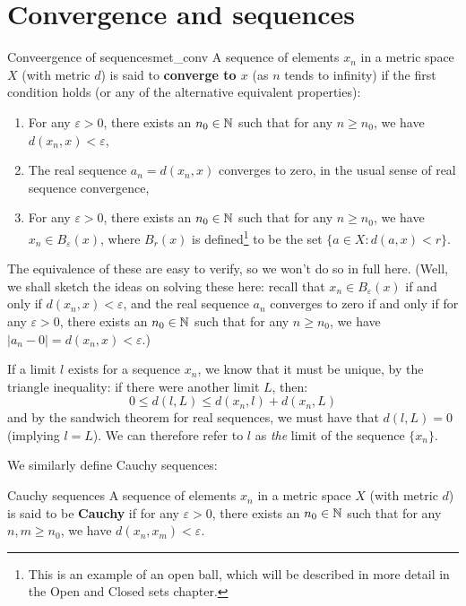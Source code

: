 \section{Convergence and sequences}

\begin{bdefin}{Conveergence of sequences}{met_conv}
A sequence of elements $x_{n}$ in a metric space $X$ (with metric $d$) is said to \textbf{converge to $x$} (as $n$ tends to infinity) if the first condition holds (or any of the alternative equivalent properties):
\begin{enumerate}
    \item For any $\varepsilon>0$, there exists an $n_{0} \in \mathbb{N}$ such that for any $n\geq n_{0}$, we have $d(x_{n},x) < \varepsilon$,
    \item The real sequence $a_{n} = d(x_{n},x)$ converges to zero, in the usual sense of real sequence convergence,
    \item For any $\varepsilon>0$, there exists an $n_{0} \in \mathbb{N}$ such that for any $n\geq n_{0}$, we have $x_{n} \in B_{\varepsilon}(x)$, where $B_{r}(x)$ is defined\footnote{This is an example of an open ball, which will be described in more detail in the Open and Closed sets chapter.} to be the set $\{a \in X : d(a,x) < r\}$.
\end{enumerate}
\end{bdefin}
The equivalence of these are easy to verify, so we won't do so in full here. (Well, we shall sketch the ideas on solving these here: recall that $x_{n} \in B_{\varepsilon}(x)$ if and only if $d(x_{n},x) < \varepsilon$, and the real sequence $a_{n}$ converges to zero if and only if for any $\varepsilon>0$, there exists an $n_{0} \in \mathbb{N}$ such that for any $n\geq n_{0}$, we have $|a_{n}-0| = d(x_{n},x) < \varepsilon$.)

If a limit $l$ exists for a sequence $x_{n}$, we know that it must be unique, by the triangle inequality: if there were another limit $L$, then: \[ 0 \leq d(l,L) \leq d(x_{n},l) + d(x_{n}, L) \] and by the sandwich theorem for real sequences, we must have that $d(l,L)=0$ (implying $l=L$). We can therefore refer to $l$ as \emph{the} limit of the sequence $\{x_{n}\}$.

We similarly define Cauchy sequences:
\begin{bdefin}{Cauchy sequences}{}
A sequence of elements $x_{n}$ in a metric space $X$ (with metric $d$) is said to be \textbf{Cauchy} if for any $\varepsilon>0$, there exists an $n_{0} \in \mathbb{N}$ such that for any $n,m \geq n_{0}$, we have $d(x_{n},x_{m}) < \varepsilon$.
\end{bdefin}

